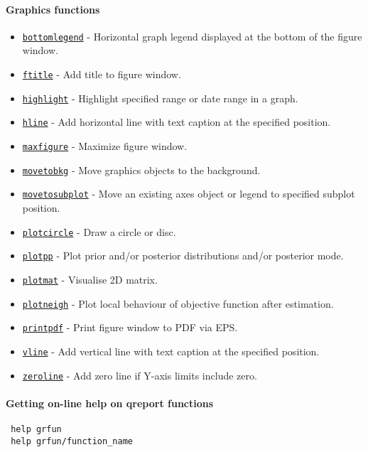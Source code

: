 

	\paragraph{Graphics functions}
 
 \begin{itemize}
 \item
   \href{grfun/bottomlegend}{\texttt{bottomlegend}} - Horizontal graph
   legend displayed at the bottom of the figure window.
 \item
   \href{grfun/ftitle}{\texttt{ftitle}} - Add title to figure window.
 \item
   \href{grfun/highlight}{\texttt{highlight}} - Highlight specified range
   or date range in a graph.
 \item
   \href{grfun/hline}{\texttt{hline}} - Add horizontal line with text
   caption at the specified position.
 \item
   \href{grfun/maxfigure}{\texttt{maxfigure}} - Maximize figure window.
 \item
   \href{grfun/movetobkg}{\texttt{movetobkg}} - Move graphics objects to
   the background.
 \item
   \href{grfun/movetosubplot}{\texttt{movetosubplot}} - Move an existing
   axes object or legend to specified subplot position.
 \item
   \href{grfun/plotcircle}{\texttt{plotcircle}} - Draw a circle or disc.
 \item
   \href{grfun/plotpp}{\texttt{plotpp}} - Plot prior and/or posterior
   distributions and/or posterior mode.
 \item
   \href{grfun/plotmat}{\texttt{plotmat}} - Visualise 2D matrix.
 \item
   \href{grfun/plotneigh}{\texttt{plotneigh}} - Plot local behaviour of
   objective function after estimation.
 \item
   \href{grfun/printpdf}{\texttt{printpdf}} - Print figure window to PDF
   via EPS.
 \item
   \href{grfun/vline}{\texttt{vline}} - Add vertical line with text
   caption at the specified position.
 \item
   \href{grfun/zeroline}{\texttt{zeroline}} - Add zero line if Y-axis
   limits include zero.
 \end{itemize}
 
 \paragraph{Getting on-line help on qreport functions}
 
 \begin{verbatim}
 help grfun
 help grfun/function_name
 \end{verbatim}



